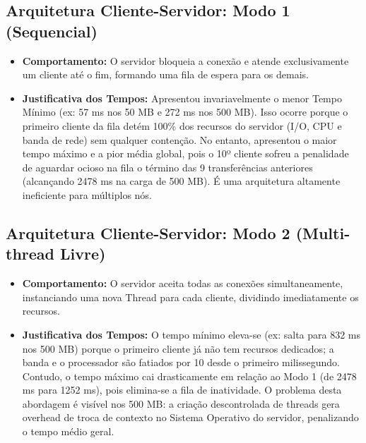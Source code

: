 \documentclass[12pt, a4paper]{article}
\begin{document}
\subsection{Arquitetura Cliente-Servidor: Modo 1 (Sequencial)}
\begin{itemize}
    \item \textbf{Comportamento:} O servidor bloqueia a conexão e atende exclusivamente um cliente até o fim, formando uma fila de espera para os demais.
    \item \textbf{Justificativa dos Tempos:} Apresentou invariavelmente o menor Tempo Mínimo (ex: 57 ms nos 50 MB e 272 ms nos 500 MB). Isso ocorre porque o primeiro cliente da fila detém 100\% dos recursos do servidor (I/O, CPU e banda de rede) sem qualquer contenção. No entanto, apresentou o maior tempo máximo e a pior média global, pois o 10º cliente sofreu a penalidade de aguardar ocioso na fila o término das 9 transferências anteriores (alcançando 2478 ms na carga de 500 MB). É uma arquitetura altamente ineficiente para múltiplos nós.
\end{itemize}

\subsection{Arquitetura Cliente-Servidor: Modo 2 (Multi-thread Livre)}
\begin{itemize}
    \item \textbf{Comportamento:} O servidor aceita todas as conexões simultaneamente, instanciando uma nova Thread para cada cliente, dividindo imediatamente os recursos.
    \item \textbf{Justificativa dos Tempos:} O tempo mínimo eleva-se (ex: salta para 832 ms nos 500 MB) porque o primeiro cliente já não tem recursos dedicados; a banda e o processador são fatiados por 10 desde o primeiro milissegundo. Contudo, o tempo máximo cai drasticamente em relação ao Modo 1 (de 2478 ms para 1252 ms), pois elimina-se a fila de inatividade. O problema desta abordagem é visível nos 500 MB: a criação descontrolada de threads gera overhead de troca de contexto no Sistema Operativo do servidor, penalizando o tempo médio geral.
\end{itemize}
\end{document}
